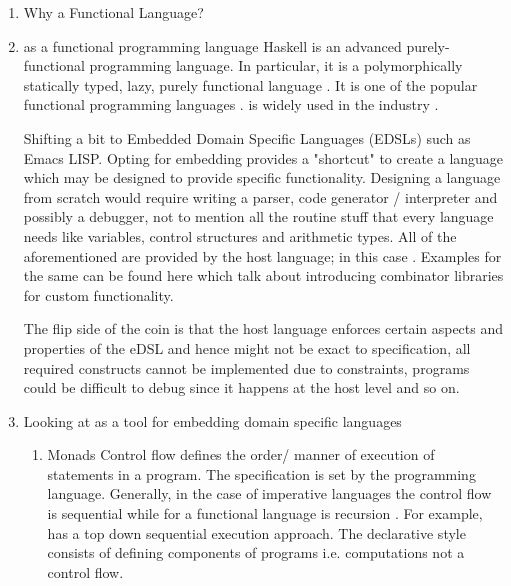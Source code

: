 \documentclass[thesis-solanki.tex]{subfiles}
\begin{document}
\begin{enumerate}

\item Why a Functional Language?

\item
   as a functional programming language Haskell is an advanced purely-functional programming
  language.
  In particular, it is a polymorphically statically typed, lazy, purely functional language
  \cite{website:haskellwiki}.
  It is one of the popular functional programming languages \cite{website:langpop}.
   is widely used in the industry \cite{website:haskellinindustry}.

  Shifting a bit to Embedded Domain Specific Languages (EDSLs) such as Emacs LISP.
  Opting for embedding provides a "shortcut" to create a language which may be designed to provide specific
  functionality.
  Designing a language from scratch would require writing a parser, code generator / interpreter and possibly a
  debugger, not to mention all the routine stuff that every language needs like variables, control structures and
  arithmetic types.
  All of the aforementioned are provided by the host language; in this case .
  Examples for the same can be found here \cite{jones2001composing, meyer2008eiffel} which talk about introducing
  combinator libraries for custom functionality.

  The flip side of the coin is that the host language enforces certain aspects and properties of the eDSL and hence
  might not be exact to specification, all required constructs cannot be implemented due to constraints, programs
  could be difficult to debug since it happens at the host level and so on.

\item Looking at  as a tool for embedding domain specific languages\cite{website:paulspontifications}

\begin{enumerate}
\item Monads
\newline
Control flow defines the order/ manner of execution of statements in a pro\-gram\cite{website:controlflowwiki}.
The specification is set by the programming language.
Generally, in the case of imperative languages the control flow is sequential while for a functional language is
recursion \cite{website:controlflowdalhousie}.
For example,  has a top down sequential execution approach.
The declarative style consists of defining components of programs i.e.
computations not a control flow\cite{website:declarativeprogrammingwiki}.


\end{enumerate}
\end{enumerate}
\end{document}
